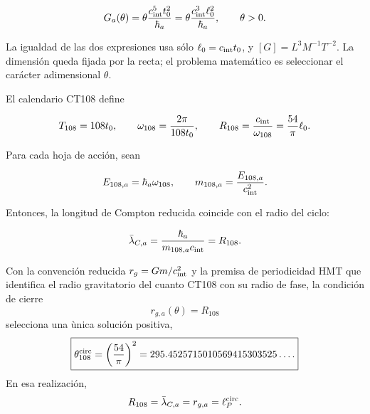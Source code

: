 \begin{equation}
\label{rm:eq:gravity-transducer}
G_a(\theta)
=\theta\frac{c_{\rm int}^{5}t_0^2}{\hbar_a}
=\theta\frac{c_{\rm int}^{3}\ell_0^2}{\hbar_a},
\qquad \theta>0.
\end{equation}

La igualdad de las dos expresiones usa s\'olo
\(\ell_0=c_{\rm int}t_0\), y
\([G]=L^3M^{-1}T^{-2}\). La dimensi\'on queda fijada por la recta; el
problema matem\'atico es seleccionar el car\'acter adimensional \(\theta\).

El calendario CT108 define

\begin{equation}
\label{rm:eq:gravity-clock108}
T_{108}=108t_0,
\qquad
\omega_{108}=\frac{2\pi}{108t_0},
\qquad
R_{108}=\frac{c_{\rm int}}{\omega_{108}}
=\frac{54}{\pi}\ell_0.
\end{equation}

Para cada hoja de acci\'on, sean

\begin{equation}
\label{rm:eq:gravity-clock-energy-mass}
E_{108,a}=\hbar_a\omega_{108},
\qquad
m_{108,a}=\frac{E_{108,a}}{c_{\rm int}^2}.
\end{equation}

Entonces, la longitud de Compton reducida coincide con el radio del ciclo:

\begin{equation}
\label{rm:eq:gravity-compton-clock}
\bar\lambda_{C,a}
=\frac{\hbar_a}{m_{108,a}c_{\rm int}}
=R_{108}.
\end{equation}

\begin{theorem}
\label{rm:thm:gravity-circular-selector}
Con la convenci\'on reducida
\(r_g=Gm/c_{\rm int}^2\) y la premisa de periodicidad HMT que identifica el radio
gravitatorio del cuanto CT108 con su radio de fase, la condici\'on de cierre
\begin{equation}
\label{rm:eq:gravity-closing-condition}
r_{g,a}(\theta)=R_{108}
\end{equation}
selecciona una \`unica soluci\'on positiva,
\begin{equation}
\label{rm:eq:gravity-theta108}
\boxed{
\theta_{108}^{\rm circ}=\left(\frac{54}{\pi}\right)^2
=295.4525715010569415303525\ldots .}
\end{equation}
En esa realizaci\'on,
\begin{equation}
\label{rm:eq:gravity-four-lengths}
R_{108}=\bar\lambda_{C,a}=r_{g,a}=\ell_P^{\rm circ}.
\end{equation}
\end{theorem}

